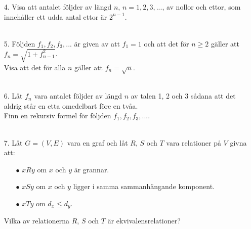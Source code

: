 \documentclass{article}
\begin{document}
\begin{enumerate}
\item[4.]
    Visa att antalet följder av längd $n$, $n=1,2,3,...$, av nollor och ettor, 
    som innehåller ett udda antal ettor är $2^{n-1}$.\\\\

\item[5.]
    Följden $f_1, f_2, f_3,...$ är given av att $f_1=1$ och att det för $n \ge 
    2$ gäller att $f_n = \sqrt{1+f^2_{n-1}}$.\\
    Visa att det för alla $n$ gäller att $f_n = \sqrt{n}$.\\\\

\item[6.]
    Låt $f_n$ vara antalet följder av längd $n$ av talen 1, 2 och 3 sådana att 
    det aldrig står en etta omedelbart före en tvåa.\\
    Finn en rekursiv formel för följden $f_1, f_2, f_3,...$.\\\\

\item[7.]
    Låt $G=(V,E)$ vara en graf och låt $R$, $S$ och $T$ vara relationer på $V$ 
    givna att:
    \begin{itemize}
        \item[$\bullet$] $xRy$ om $x$ och $y$ är grannar.
        \item[$\bullet$] $xSy$ om $x$ och $y$ ligger i samma sammanhängande 
                       komponent.
        \item[$\bullet$] $xTy$ om $d_{x} \leq d_{y}$.
    \end{itemize}
    Vilka av relationerna $R$, $S$ och $T$ är ekvivalensrelationer?\\

\end{enumerate}
\end{document}
